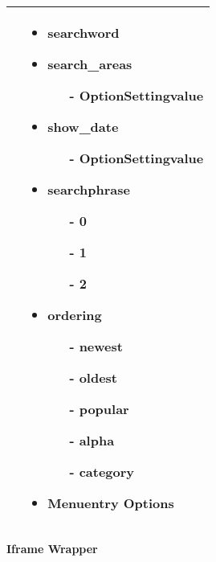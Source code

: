 \begin{minipage}{0.7\textwidth}
\begin{tabular}{|p{} | p{}|}
 & 
 \begin{itemize}
 \item searchword
 \item search\_areas
 \begin{enumerate}
  	\item[-] OptionSettingvalue
  \end{enumerate} 
 \item show\_date
 \begin{enumerate}
  	\item[-] OptionSettingvalue
  \end{enumerate}
 \item searchphrase
 \begin{enumerate}
  	\item[-] 0
  	\item[-] 1
  	\item[-] 2
  \end{enumerate} 
 \item ordering
 \begin{enumerate}
  	\item[-] newest
  	\item[-] oldest
  	\item[-] popular
  	\item[-] alpha
  	\item[-] category
  \end{enumerate} 
  \item Menuentry Options
 \end{itemize}
\\
\hline
\end{tabular}
\end{minipage}

\textbf{Iframe Wrapper}

